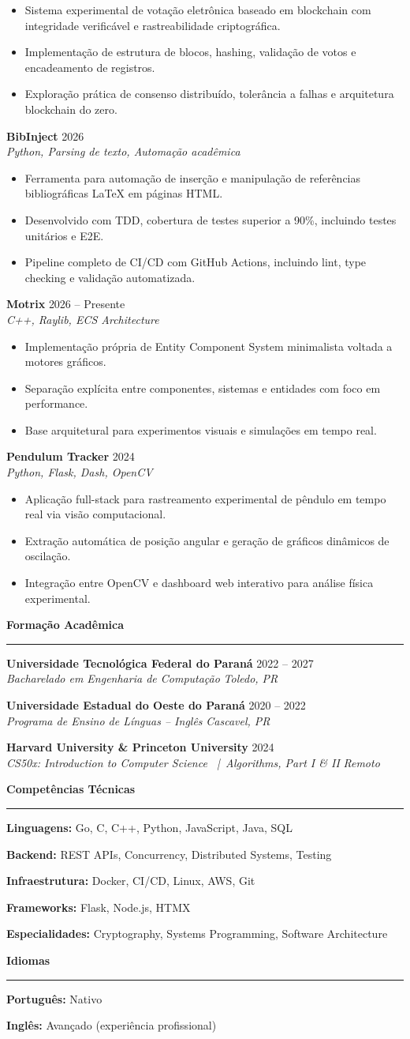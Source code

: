 \documentclass[letterpaper,11pt]{article}
\newcommand{\cvsection}[2][6pt]{
\vspace{#1}
{\large\bfseries\color{cvblue} #2}\\[-6pt]
{\color{cvblue}\rule{\textwidth}{0.4pt}}
\vspace{-6pt}
}
\newcommand{\cvtitle}[2]{
\textbf{#1} \hfill {\color{cvgray}#2}
}
\newcommand{\cvsubtitle}[2]{
\textit{\color{cvgray}#1} \hfill \textit{\color{cvgray}#2}
}
\newcommand{\cventry}[4]{
\cvtitle{#1}{#2}\\
\cvsubtitle{#3}{#4}
\vspace{2pt}
}
\newcommand{\cvbullet}[1]{
\item #1
}
\newcommand{\cvliststart}{
\begin{itemize}
}
\newcommand{\cvlistend}{
\end{itemize}
}
\newcommand{\cvskill}[2]{
\textbf{\color{cvblue}#1:} #2\par
}
\newcommand{\cvlanguage}[2]{
\textbf{\color{cvblue}#1:} #2\par
}
\begin{document}
\cvliststart
\cvbullet{Sistema experimental de votação eletrônica baseado em blockchain com integridade verificável e rastreabilidade criptográfica.}
\cvbullet{Implementação de estrutura de blocos, hashing, validação de votos e encadeamento de registros.}
\cvbullet{Exploração prática de consenso distribuído, tolerância a falhas e arquitetura blockchain do zero.}
\cvlistend

\cventry
{BibInject}
{2026}
{Python, Parsing de texto, Automação acadêmica}
{}

\cvliststart
\cvbullet{Ferramenta para automação de inserção e manipulação de referências bibliográficas LaTeX em páginas HTML.}
\cvbullet{Desenvolvido com TDD, cobertura de testes superior a 90\%, incluindo testes unitários e E2E.}
\cvbullet{Pipeline completo de CI/CD com GitHub Actions, incluindo lint, type checking e validação automatizada.}
\cvlistend

\cventry
{Motrix}
{2026 -- Presente}
{C++, Raylib, ECS Architecture}
{}

\cvliststart
\cvbullet{Implementação própria de Entity Component System minimalista voltada a motores gráficos.}
\cvbullet{Separação explícita entre componentes, sistemas e entidades com foco em performance.}
\cvbullet{Base arquitetural para experimentos visuais e simulações em tempo real.}
\cvlistend

\cventry
{Pendulum Tracker}
{2024}
{Python, Flask, Dash, OpenCV}
{}

\cvliststart
\cvbullet{Aplicação full-stack para rastreamento experimental de pêndulo em tempo real via visão computacional.}
\cvbullet{Extração automática de posição angular e geração de gráficos dinâmicos de oscilação.}
\cvbullet{Integração entre OpenCV e dashboard web interativo para análise física experimental.}
\cvlistend

\cvsection{Formação Acadêmica}

\cventry
{Universidade Tecnológica Federal do Paraná}
{2022 -- 2027}
{Bacharelado em Engenharia de Computação}
{Toledo, PR}

\cventry
{Universidade Estadual do Oeste do Paraná}
{2020 -- 2022}
{Programa de Ensino de Línguas -- Inglês}
{Cascavel, PR}

\cventry
{Harvard University \& Princeton University}
{2024}
{CS50x: Introduction to Computer Science \ |\ Algorithms, Part I \& II}
{Remoto}

\cvsection{Competências Técnicas}

\cvskill{Linguagens}{Go, C, C++, Python, JavaScript, Java, SQL}
\cvskill{Backend}{REST APIs, Concurrency, Distributed Systems, Testing}
\cvskill{Infraestrutura}{Docker, CI/CD, Linux, AWS, Git}
\cvskill{Frameworks}{Flask, Node.js, HTMX}
\cvskill{Especialidades}{Cryptography, Systems Programming, Software Architecture}

\cvsection{Idiomas}

\cvlanguage{Português}{Nativo}
\cvlanguage{Inglês}{Avançado (experiência profissional)}
\end{document}
